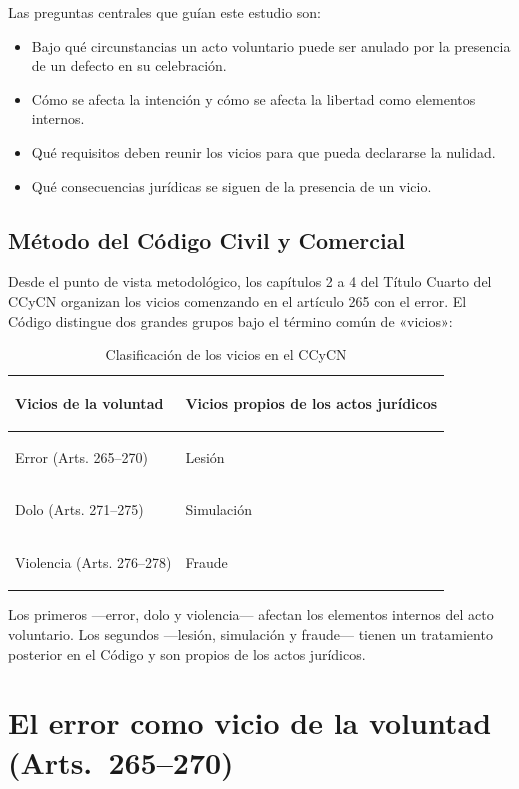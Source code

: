 \documentclass[12pt,oneside]{book}
\begin{document}
Las preguntas centrales que guían este estudio son:
\begin{itemize}
    \item Bajo qué circunstancias un acto voluntario puede ser anulado por la presencia de un defecto en su celebración.
    \item Cómo se afecta la intención y cómo se afecta la libertad como elementos internos.
    \item Qué requisitos deben reunir los vicios para que pueda declararse la nulidad.
    \item Qué consecuencias jurídicas se siguen de la presencia de un vicio.
\end{itemize}

\section{Método del Código Civil y Comercial}

Desde el punto de vista metodológico, los capítulos 2 a 4 del Título Cuarto del CCyCN organizan los vicios comenzando en el artículo 265 con el error. El Código distingue dos grandes grupos bajo el término común de «vicios»:

\begin{table}[H]
\centering
\begin{tabularx}{\textwidth}{>{\bfseries\raggedright\arraybackslash}X >{\raggedright\arraybackslash}X}
\toprule
\textbf{Vicios de la voluntad} & \textbf{Vicios propios de los actos jurídicos} \\
\midrule
Error (Arts. 265--270) & Lesión \\
Dolo (Arts. 271--275) & Simulación \\
Violencia (Arts. 276--278) & Fraude \\
\bottomrule
\end{tabularx}
\caption{Clasificación de los vicios en el CCyCN}
\end{table}

Los primeros ---error, dolo y violencia--- afectan los elementos internos del acto voluntario. Los segundos ---lesión, simulación y fraude--- tienen un tratamiento posterior en el Código y son propios de los actos jurídicos.

\chapter{El error como vicio de la voluntad (Arts.~265--270)}
\end{document}
